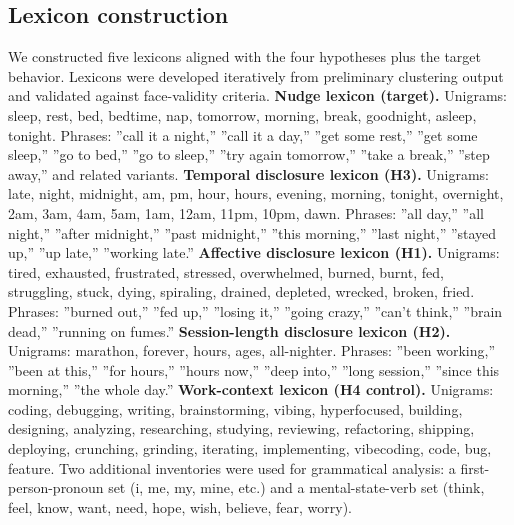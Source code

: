 \documentclass{obelus-preprint}
\begin{document}
\subsection{Lexicon construction}
We constructed five lexicons aligned with the four hypotheses plus the target behavior. Lexicons were developed iteratively from preliminary clustering output and validated against face-validity criteria.
\textbf{Nudge lexicon (target).} Unigrams: sleep, rest, bed, bedtime, nap, tomorrow, morning, break, goodnight, asleep, tonight. Phrases: ''call it a night,'' ''call it a day,'' ''get some rest,'' ''get some sleep,'' ''go to bed,'' ''go to sleep,'' ''try again tomorrow,'' ''take a break,'' ''step away,'' and related variants.
\textbf{Temporal disclosure lexicon (H3).} Unigrams: late, night, midnight, am, pm, hour, hours, evening, morning, tonight, overnight, 2am, 3am, 4am, 5am, 1am, 12am, 11pm, 10pm, dawn. Phrases: ''all day,'' ''all night,'' ''after midnight,'' ''past midnight,'' ''this morning,'' ''last night,'' ''stayed up,'' ''up late,'' ''working late.''
\textbf{Affective disclosure lexicon (H1).} Unigrams: tired, exhausted, frustrated, stressed, overwhelmed, burned, burnt, fed, struggling, stuck, dying, spiraling, drained, depleted, wrecked, broken, fried. Phrases: ''burned out,'' ''fed up,'' ''losing it,'' ''going crazy,'' ''can't think,'' ''brain dead,'' ''running on fumes.''
\textbf{Session-length disclosure lexicon (H2).} Unigrams: marathon, forever, hours, ages, all-nighter. Phrases: ''been working,'' ''been at this,'' ''for hours,'' ''hours now,'' ''deep into,'' ''long session,'' ''since this morning,'' ''the whole day.''
\textbf{Work-context lexicon (H4 control).} Unigrams: coding, debugging, writing, brainstorming, vibing, hyperfocused, building, designing, analyzing, researching, studying, reviewing, refactoring, shipping, deploying, crunching, grinding, iterating, implementing, vibecoding, code, bug, feature.
Two additional inventories were used for grammatical analysis: a first-person-pronoun set (i, me, my, mine, etc.) and a mental-state-verb set (think, feel, know, want, need, hope, wish, believe, fear, worry).
\end{document}
